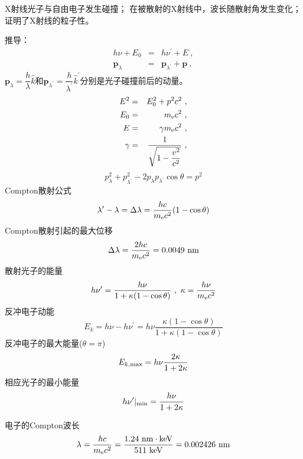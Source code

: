 \documentclass[12pt,a4paper]{article}
\renewcommand{\vec}[1]{\boldsymbol{#1}}
\begin{document}
X射线光子与自由电子发生碰撞；
在被散射的X射线中，波长随散射角发生变化；
证明了X射线的粒子性。

推导：
\begin{eqnarray}
h \nu + E_0 &=& h\nu^{\prime} +E ~, \\
\vec{p}_\lambda &=& \vec{p}_{\lambda^{\prime}} + \vec{p} ~,
\end{eqnarray}
$\vec{p}_\lambda = \dfrac{h}{\lambda} \hat{k}$和$\vec{p}_{\lambda^{\prime}} = \dfrac{h}{\lambda^{\prime}} \hat{k}^{\prime}$分别是光子碰撞前后的动量。
\begin{eqnarray*}
E^2 &=& E_0^2 +p^2 c^2 ~, \\
E_0 &=& m_{\rm e} c^2 ~,\\
E &=& \gamma m_{\rm e} c^2 ~,\\
\gamma &=& \frac{1}{\sqrt{1-\dfrac{v^2}{c^2}}} ~,
\end{eqnarray*}
\begin{equation*}
p_\lambda^2 + p_{\lambda^{\prime}}^2 - 2p_\lambda p_{\lambda^{\prime}} \cos \theta = p^2
\end{equation*}
Compton散射公式
\begin{equation}
\lambda^{\prime} - \lambda = \Delta \lambda = \frac{h c}{m_{\rm e} c^2} (1-\cos \theta)
\end{equation}
Compton散射引起的最大位移
\begin{equation*}
\Delta \lambda = \frac{2h c}{m_{\rm e} c^2} = 0.0049 ~\rm nm
\end{equation*}
散射光子的能量
\begin{equation*}
h\nu^{\prime} = \frac{h \nu}{1+\kappa (1-\cos \theta)} ~,~ \kappa = \frac{h\nu}{m_{\rm e} c^2}
\end{equation*}
反冲电子动能
\begin{equation*}
E_k = h \nu - h\nu^{\prime} = h\nu \frac{\kappa (1-\cos \theta)}{1+\kappa(1-\cos \theta)}
\end{equation*}
反冲电子的最大能量($\theta = \pi$)
\begin{equation*}
E_{k, \rm max} = h\nu \frac{2\kappa}{1+2\kappa}
\end{equation*}
相应光子的最小能量
\begin{equation*}
h\nu^{\prime}|_{\rm min} = \frac{h\nu}{1+2\kappa}
\end{equation*}

电子的Compton波长
\begin{equation*}
\lambda = \frac{hc}{m_{\rm e} c^2} = \frac{1.24 ~{\rm nm\cdot keV} }{511 ~{\rm keV}} = 0.002426 ~\rm nm
\end{equation*}
\end{document}
